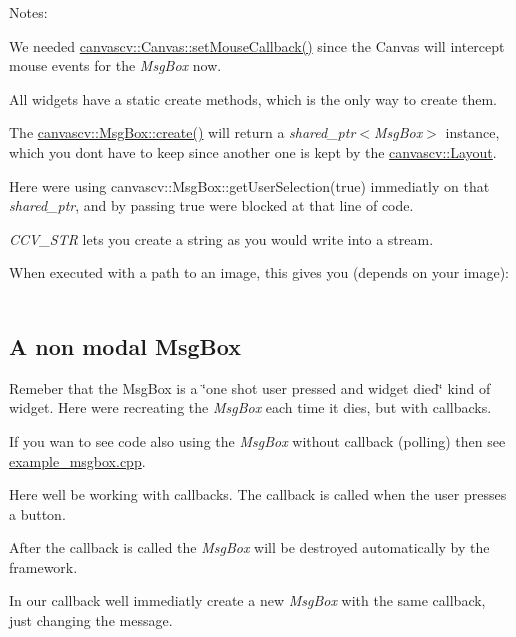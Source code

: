  Notes\+:
\begin{DoxyItemize}
\item We needed \hyperlink{classcanvascv_1_1Canvas_acf6e5d4b40aec610b0dc8c4f6bf93ac1}{canvascv\+::\+Canvas\+::set\+Mouse\+Callback()} since the Canvas will intercept mouse events for the {\itshape Msg\+Box} now.
\item All widgets have a static create methods, which is the only way to create them.
\item The \hyperlink{classcanvascv_1_1MsgBox_a3bf0019e83e367e415da29286db2c5d0}{canvascv\+::\+Msg\+Box\+::create()} will return a {\itshape shared\+\_\+ptr$<$\+Msg\+Box$>$} instance, which you don\textquotesingle{}t have to keep since another one is kept by the \hyperlink{classcanvascv_1_1Layout}{canvascv\+::\+Layout}.
\item Here we\textquotesingle{}re using canvascv\+::\+Msg\+Box\+::get\+User\+Selection(true) immediatly on that {\itshape shared\+\_\+ptr}, and by passing true we\textquotesingle{}re blocked at that line of code.
\item {\itshape C\+C\+V\+\_\+\+S\+TR} lets you create a string as you would write into a stream.
\item When executed with a path to an image, this gives you (depends on your image)\+:  ~\newline

\end{DoxyItemize}\hypertarget{tutmsgbox_msgbox_s3}{}\subsection{A non modal Msg\+Box}\label{tutmsgbox_msgbox_s3}
Remeber that the Msg\+Box is a \char`\"{}one shot user pressed and widget died\char`\"{} kind of widget. Here we\textquotesingle{}re recreating the {\itshape Msg\+Box} each time it dies, but with callbacks.

If you wan to see code also using the {\itshape Msg\+Box} without callback (polling) then see \hyperlink{example_msgbox_8cpp-example}{example\+\_\+msgbox.\+cpp}.

Here we\textquotesingle{}ll be working with callbacks. The callback is called when the user presses a button.

After the callback is called the {\itshape Msg\+Box} will be destroyed automatically by the framework.

In our callback we\textquotesingle{}ll immediatly create a new {\itshape Msg\+Box} with the same callback, just changing the message.

